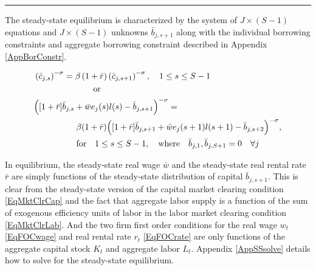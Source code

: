 \documentclass[letterpaper,12pt]{article}
\theoremstyle{definition}
\begin{document}
    \hrule
    \begin{spacing}{1.5}
    \vspace{10mm}

    The steady-state equilibrium is characterized by the system of $J\times(S-1)$ equations and $J\times(S-1)$ unknowns $\bar{b}_{j,s+1}$ along with the individual borrowing constraints and aggregate borrowing constraint described in Appendix \ref{AppBorConstr}.

    \begin{equation}\label{EqSSeuler}
      \begin{split}
        &\left(\bar{c}_{j,s}\right)^{-\sigma} = \beta \left(1+\bar{r}\right)\left(\bar{c}_{j,s+1}\right)^{-\sigma}, \quad 1\leq s\leq S-1 \\
        &\quad\quad\quad\quad\quad\quad\quad\text{or} \\
        &\Bigl([1+\bar{r}]\bar{b}_{j,s} + \bar{w}e_j(s)l(s) - \bar{b}_{j,s+1}\Bigr)^{-\sigma} = \\
        &\quad\quad\quad\quad\quad \beta(1+\bar{r})\Bigl([1+\bar{r}]\bar{b}_{j,s+1} + \bar{w}e_j(s+1)l(s+1) - \bar{b}_{j,s+2}\Bigr)^{-\sigma}, \\
        &\quad\quad\quad\quad\quad \text{for} \quad 1\leq s\leq S-1,\quad\text{where}\quad \bar{b}_{j,1},\bar{b}_{j,S+1} = 0 \quad\forall j
      \end{split}
    \end{equation}

    In equilibrium, the steady-state real wage $\bar{w}$ and the steady-state real rental rate $\bar{r}$ are simply functions of the steady-state distribution of capital $\bar{b}_{j,s+1}$. This is clear from the steady-state version of the capital market clearing condition \eqref{EqMktClrCap} and the fact that aggregate labor supply is a function of the sum of exogenous efficiency units of labor in the labor market clearing condition \eqref{EqMktClrLab}. And the two firm first order conditions for the real wage $w_t$ \eqref{EqFOCwage} and real rental rate $r_t$ \eqref{EqFOCrate} are only functions of the aggregate capital stock $K_t$ and aggregate labor $L_t$. Appendix \ref{AppSSsolve} details how to solve for the steady-state equilibrium.


\end{spacing}
\end{document}
